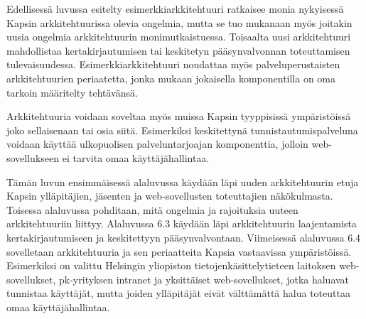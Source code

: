 Edellisessä luvussa esitelty esimerkkiarkkitehtuuri ratkaisee monia nykyisessä Kapsin arkkitehtuurissa olevia ongelmia, mutta se tuo mukanaan myös joitakin uusia ongelmia arkkitehtuurin monimutkaistuessa. Toisaalta uusi arkkitehtuuri mahdollistaa kertakirjautumisen tai keskitetyn pääsynvalvonnan toteuttamisen tulevaisuudessa. Esimerkkiarkkitehtuuri noudattaa myös palveluperustaisten arkkitehtuurien periaatetta, jonka mukaan jokaisella komponentilla on oma tarkoin määritelty tehtävänsä.

Arkkitehtuuria voidaan soveltaa myös muissa Kapsin tyyppisissä ympäristöissä joko sellaisenaan tai osia siitä. Esimerkiksi keskitettynä tunnistautumispalveluna voidaan käyttää ulkopuolisen palveluntarjoajan komponenttia, jolloin web-sovellukseen ei tarvita omaa käyttäjähallintaa.

Tämän luvun ensimmäisessä alaluvussa käydään läpi uuden arkkitehtuurin etuja Kapsin ylläpitäjien, jäsenten ja web-sovellusten toteuttajien näkökulmasta. Toisessa alaluvussa pohditaan, mitä ongelmia ja rajoituksia uuteen arkkitehtuuriin liittyy. Alaluvussa 6.3 käydään läpi arkkitehtuurin laajentamista kertakirjautumiseen ja keskitettyyn pääsynvalvontaan. Viimeisessä alaluvussa 6.4 sovelletaan arkkitehtuuria ja sen periaatteita Kapsia vastaavissa ympäristöissä. Esimerkiksi on valittu Helsingin yliopiston tietojenkäsittelytieteen laitoksen web-sovellukset, pk-yrityksen intranet ja yksittäiset web-sovellukset, jotka haluavat tunnistaa käyttäjät, mutta joiden ylläpitäjät eivät välttämättä halua toteuttaa omaa käyttäjähallintaa.
